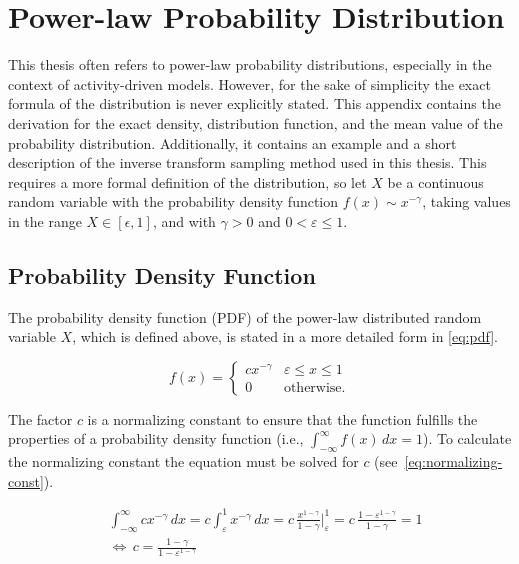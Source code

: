 \chapter{Power-law Probability Distribution}


This thesis often refers to power-law probability distributions, especially in the context of activity-driven models.
However, for the sake of simplicity the exact formula of the distribution is never explicitly stated.
This appendix contains the derivation for the exact density, distribution function, and the mean value of the probability distribution.
Additionally, it contains an example and a short description of the inverse transform sampling method used in this thesis.
This requires a more formal definition of the distribution, so let \(X\) be a continuous random variable with the probability density function \(f(x) \sim x^{-\gamma}\), taking values in the range \(X \in [\epsilon, 1]\), and with \(\gamma > 0\) and \(0 < \varepsilon \leq 1\).




\section{Probability Density Function}
\label{sec:pdf}

The probability density function (PDF) of the power-law distributed random variable \(X\), which is defined above, is stated in a more detailed form in \cref{eq:pdf}.

\begin{equation}
	f(x) =
	\begin{cases}
		c x^{-\gamma} & \varepsilon \leq x \leq 1 \\
		0             & \text{otherwise.}
	\end{cases}
	\label{eq:pdf}
\end{equation}

The factor \(c\) is a normalizing constant to ensure that the function fulfills the properties of a probability density function (i.e., \(\int_{-\infty}^{\infty} f(x) \, dx = 1\)).
To calculate the normalizing constant the equation must be solved for \(c\) (see~\cref{eq:normalizing-const}).

\begin{align}
	& \int_{-\infty}^{\infty} cx^{-\gamma} \, dx = c \int_{\varepsilon}^{1} x^{-\gamma} \, dx = c \, \frac{x^{1-\gamma}}{1-\gamma}  \bigg |_{\varepsilon}^{1} = c \, \frac{1 - \varepsilon^{1-\gamma}}{1-\gamma} = 1 \\
	& \Leftrightarrow \, c = \frac{1-\gamma}{1 - \varepsilon^{1-\gamma}}
	\label{eq:normalizing-const}
\end{align}


